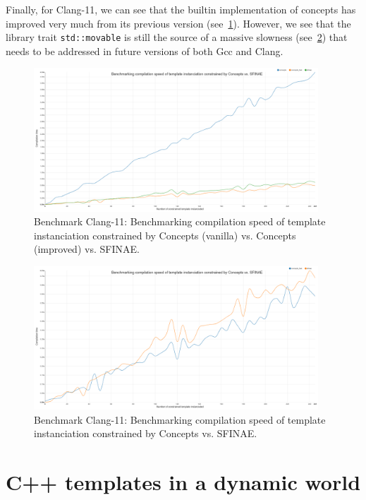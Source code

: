 Finally, for Clang-11, we can see that the builtin implementation of concepts has improved very much from its previous
version (see~\cref{fig:gen.bench.clang11.1.concept.sfinae}). However, we see that the library trait
\texttt{std::movable} is still the source of a massive slowness (see~\cref{fig:gen.bench.clang11.2.concept.sfinae}) that
needs to be addressed in future versions of both Gcc and Clang.

\begin{figure}[htb]
  \centering
  \includegraphics[width=4.2in]{figs/compile_time_benches/clang11/chart.concept.png}
  \caption{Benchmark Clang-11: Benchmarking compilation speed of template instanciation constrained by Concepts (vanilla) vs. Concepts (improved) vs. SFINAE.}
  \label{fig:gen.bench.clang11.1.concept.sfinae}
\end{figure}

\begin{figure}[htb]
  \centering
  \includegraphics[width=4.2in]{figs/compile_time_benches/clang11/chart.concept2.png}
  \caption{Benchmark Clang-11: Benchmarking compilation speed of template instanciation constrained by Concepts vs. SFINAE.}
  \label{fig:gen.bench.clang11.2.concept.sfinae}
\end{figure}


\section{C++ templates in a dynamic world}
\label{sec:template.dynworld}

